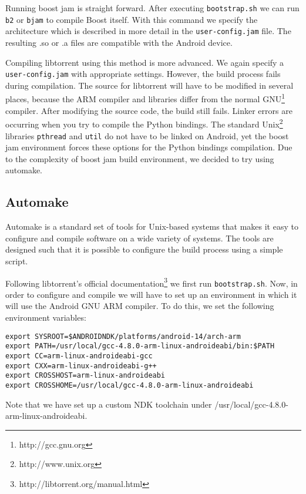		Running boost jam is straight forward. After executing \texttt{bootstrap.sh} we can run \texttt{b2} or \texttt{bjam} to compile Boost itself. With this command we specify the architecture which is described in more detail in the \texttt{user-config.jam} file. The resulting .so or .a files are compatible with the Android device.
		
		Compiling libtorrent using this method is more advanced. We again specify a \texttt{user-config.jam} with appropriate settings. However, the build process fails during compilation. The source for libtorrent will have to be modified in several places, because the ARM compiler and libraries differ from the normal GNU\footnote{http://gcc.gnu.org} compiler. After modifying the source code, the build still fails. Linker errors are occurring when you try to compile the Python bindings. The standard Unix\footnote{http://www.unix.org} libraries \texttt{pthread} and \texttt{util} do not have to be linked on Android, yet the boost jam environment forces these options for the Python bindings compilation. Due to the complexity of boost jam build environment, we decided to try using automake.
		
		\subsection{Automake}
		Automake is a standard set of tools for Unix-based systems that makes it easy to configure and compile software on a wide variety of systems. The tools are designed such that it is possible to configure the build process using a simple script.
		
		Following libtorrent's official documentation\footnote{http://libtorrent.org/manual.html} we first run \texttt{bootstrap.sh}. Now, in order to configure and compile we will have to set up an environment in which it will use the Android GNU ARM compiler. To do this, we set the following environment variables:
		
		\begin{lstlisting}
export SYSROOT=$ANDROIDNDK/platforms/android-14/arch-arm
export PATH=/usr/local/gcc-4.8.0-arm-linux-androideabi/bin:$PATH
export CC=arm-linux-androideabi-gcc
export CXX=arm-linux-androideabi-g++
export CROSSHOST=arm-linux-androideabi
export CROSSHOME=/usr/local/gcc-4.8.0-arm-linux-androideabi
		\end{lstlisting}
		
		Note that we have set up a custom NDK toolchain under /usr/local/gcc-4.8.0-arm-linux-androideabi. 
		
